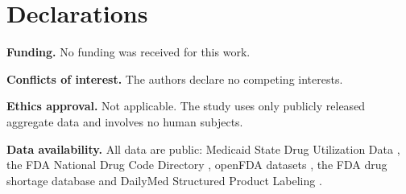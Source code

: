 \documentclass[pdflatex,sn-vancouver-num,Numbered]{sn-jnl}
\begin{document}
\begin{table}[htbp]
\centering
\caption{Route coverage by year, as a share of dispensing volume in the national panel.
Records whose FDA listing carries no \texttt{ROUTENAME} are passed to the form-string
cascade described in Section~\ref{subsec:market}, and only those matching none of its tests are
assigned to \textsc{other} rather than dropped. This table reports how much dispensing volume in
each year carries an explicit route and is therefore unaffected by that fallback.}\label{tab:routecov}

\end{table}


\backmatter

\section*{Declarations}

\textbf{Funding.} No funding was received for this work.

\textbf{Conflicts of interest.} The authors declare no competing interests.

\textbf{Ethics approval.} Not applicable. The study uses only publicly released aggregate data
and involves no human subjects.

\textbf{Data availability.} All data are public: Medicaid State Drug Utilization Data
\cite{cms_sdud}, the FDA National Drug Code Directory \cite{fda_ndc}, openFDA datasets
\cite{openfda}, the FDA drug shortage database \cite{fda_shortages} and DailyMed Structured
Product Labeling \cite{dailymed}.
\end{document}
